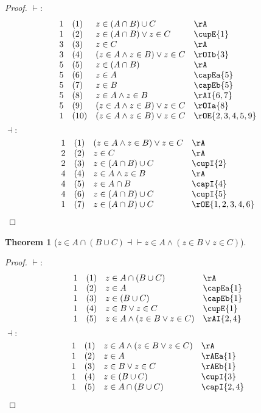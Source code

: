 \documentclass{book}
\theoremstyle{plain}
\newtheorem{theorem}{Theorem}
\theoremstyle{remark}
\theoremstyle{definition}
\begin{document}
\begin{proof}
	\(\vdash:\)
	\[
	\begin{array}{llll}
		1 & (1) & z \in (A\cap B)\cup C & \rA \\
		1 & (2) & z\in (A\cap B)\lor z\in C & \cupE{1} \\
		3 & (3) & z\in C & \rA \\
		3 & (4) & (z\in A\land z\in B)\lor z\in C & \rOIb{3} \\
		5 & (5) & z\in (A\cap B) & \rA \\
		5 & (6) & z\in A & \capEa{5} \\
		5 & (7) & z\in B & \capEb{5} \\
		5 & (8) & z\in A\land z\in B & \rAI{6,7} \\
		5 & (9) & (z\in A\land z\in B)\lor z\in C & \rOIa{8} \\
		1 & (10) & (z\in A\land z\in B)\lor z\in C & \rOE{2,3,4,5,9} \\
	\end{array}
	\]
	\(\dashv:\)
	\[
	\begin{array}{llll}
		1 & (1) & (z\in A\land z\in B)\lor z\in C & \rA\\			
		2 & (2) & z\in C & \rA\\			
		2 & (3) & z\in (A\cap B)\cup C & \cupI{2} \\			
		4 & (4) & z\in A\land z\in B & \rA \\	
		4 & (5) & z\in A\cap B & \capI{4} \\
		4 & (6) & z\in (A\cap B)\cup C & \cupI{5} \\
		1 & (7) & z\in (A\cap B)\cup C & \rOE{1,2,3,4,6} \\
	\end{array}
	\]
\end{proof}

\label{zInAcaLpBcuCRpEqvzInAAndLpzInBOrzInCRp}
\begin{theorem}[\(z \in A\cap (B\cup C) \dashv\vdash z \in A\land (z\in B\lor z\in C)\)]
\end{theorem}	
\begin{proof}
	\(\vdash:\)
	\[
	\begin{array}{llll}
		1 & (1) & z \in A\cap (B\cup C) & \rA \\
		1 & (2) & z\in A & \capEa{1} \\
		1 & (3) & z\in (B\cup C) & \capEb{1} \\
		1 & (4) & z\in B\lor z\in C & \cupE{1} \\
		1 & (5) & z\in A\land(z\in B\lor z\in C) & \rAI{2,4} \\
	\end{array}
	\]
	\(\dashv:\)
	\[
	\begin{array}{llll}
		1 & (1) & z\in A\land (z\in B\lor z\in C) & \rA\\			
		1 & (2) & z\in A & \rAEa{1}\\	
		1 & (3) & z\in B\lor z\in C & \rAEb{1}\\	
		1 & (4) & z\in (B\cup C) & \cupI{3}\\	
		1 & (5) & z\in A\cap(B\cup C) & \capI{2,4}\\	
	\end{array}
	\]
\end{proof}
\end{document}
